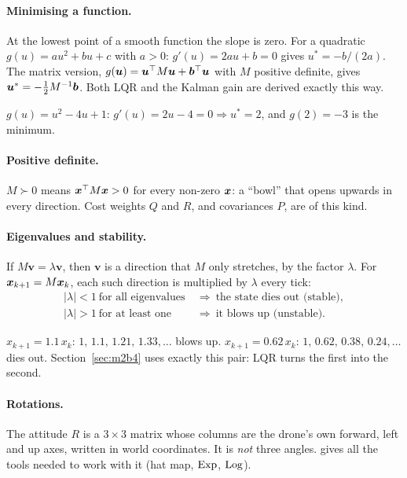 \paragraph{Minimising a function.} At the lowest point of a smooth function the slope is zero. For a quadratic
$g(u)=a u^2+b u+c$ with $a>0$: $g'(u)=2au+b=0$ gives $u^*=-b/(2a)$. The matrix version, $g(\bm{u})=\bm{u}^\top M\bm{u}+\bm b^\top\bm{u}$
with $M$ positive definite, gives $\bm{u}^*=-\tfrac12M^{-1}\bm b$. Both LQR and the Kalman gain are derived exactly this way.
\begin{toybox}
$g(u)=u^2-4u+1$: $g'(u)=2u-4=0\Rightarrow u^*=2$, and $g(2)=-3$ is the minimum.
\end{toybox}

\paragraph{Positive definite.} $M\succ0$ means $\bm{x}^\top M\bm{x}>0$ for every non-zero $\bm{x}$: a ``bowl'' that opens upwards
in every direction. Cost weights $Q$ and $R$, and covariances $P$, are of this kind.

\paragraph{Eigenvalues and stability.} If $M\bm v=\lambda\bm v$, then $\bm v$ is a direction that $M$ only stretches, by
the factor $\lambda$. For $\bm{x}_{k+1}=M\bm{x}_k$, each such direction is multiplied by $\lambda$ every tick:
\[
\begin{aligned}
|\lambda|<1\ \text{for all eigenvalues} &\ \Rightarrow\ \text{the state dies out (stable)},\\
|\lambda|>1\ \text{for at least one} &\ \Rightarrow\ \text{it blows up (unstable)}.
\end{aligned}
\]
\begin{toybox}
$x_{k+1}=1.1\,x_k$: $1,\,1.1,\,1.21,\,1.33,\dots$ blows up. $x_{k+1}=0.62\,x_k$: $1,\,0.62,\,0.38,\,0.24,\dots$ dies out.
Section~\ref{sec:m2b4} uses exactly this pair: LQR turns the first into the second.
\end{toybox}

\paragraph{Rotations.} The attitude $R$ is a $3\times3$ matrix whose columns are the drone's own forward, left and up
axes, written in world coordinates. It is \emph{not} three angles.  gives all the tools needed to work
with it (hat map, $\mathrm{Exp}$, $\mathrm{Log}$).
